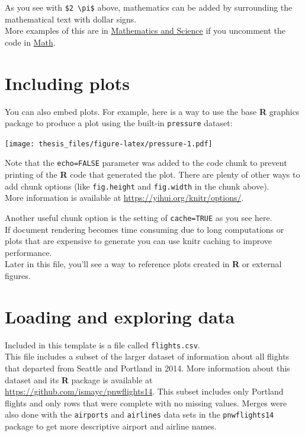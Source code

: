 \documentclass[12pt,oneside]{tisemthesis}
\begin{document}
As you see with \texttt{\$2\ \textbackslash{}pi\$} above, mathematics can be added by surrounding the mathematical text with dollar signs.\\
More examples of this are in \protect\hyperlink{math-sci}{Mathematics and Science} if you uncomment the code in \protect\hyperlink{math}{Math}.

\hypertarget{including-plots}{%
\section{Including plots}\label{including-plots}}

You can also embed plots.
For example, here is a way to use the base \textbf{R} graphics package to produce a plot using the built-in \texttt{pressure} dataset:

\texttt{[image: thesis\_files/figure-latex/pressure-1.pdf]}

Note that the \texttt{echo=FALSE} parameter was added to the code chunk to prevent printing of the \textbf{R} code that generated the plot.
There are plenty of other ways to add chunk options (like \texttt{fig.height} and \texttt{fig.width} in the chunk above).\\
More information is available at \url{https://yihui.org/knitr/options/}.

Another useful chunk option is the setting of \texttt{cache=TRUE} as you see here.\\
If document rendering becomes time consuming due to long computations or plots that are expensive to generate you can use knitr caching to improve performance.\\
Later in this file, you'll see a way to reference plots created in \textbf{R} or external figures.

\hypertarget{loading-and-exploring-data}{%
\section{Loading and exploring data}\label{loading-and-exploring-data}}

Included in this template is a file called \texttt{flights.csv}.\\
This file includes a subset of the larger dataset of information about all flights that departed from Seattle and Portland in 2014.
More information about this dataset and its \textbf{R} package is available at \url{https://github.com/ismayc/pnwflights14}.
This subset includes only Portland flights and only rows that were complete with no missing values.
Merges were also done with the \texttt{airports} and \texttt{airlines} data sets in the \texttt{pnwflights14} package to get more descriptive airport and airline names.
\end{document}
